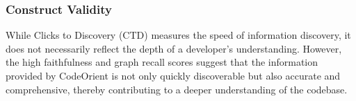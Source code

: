 \subsubsection{Construct Validity}
While Clicks to Discovery (CTD) measures the speed of information discovery, it does not necessarily reflect the depth of a developer's understanding. However, the high faithfulness and graph recall scores suggest that the information provided by CodeOrient is not only quickly discoverable but also accurate and comprehensive, thereby contributing to a deeper understanding of the codebase.




